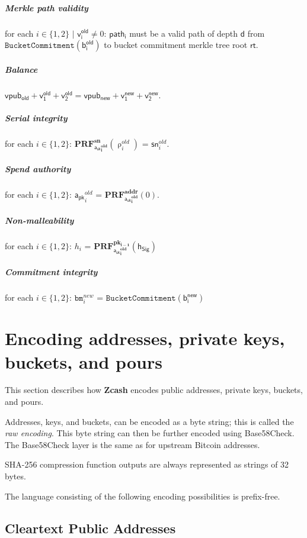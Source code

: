 \documentclass[8pt]{article}
\newcommand{\Zcash}{\textbf{Zcash} }
\newcommand{\SpendAuthorityPublic}{\mathsf{a_{pk}}}
\newcommand{\SpendAuthorityPrivate}{\mathsf{a_{sk}}}
\newcommand{\BucketAddressRand}{\mathsf{\uprho}}
\newcommand{\PRF}[2]{\mathbf{PRF_{#1}^{#2}}}
\newcommand{\PRFaddr}[1]{\PRF{#1}{addr}}
\newcommand{\PRFsn}[1]{\PRF{#1}{sn}}
\newcommand{\PRFpk}[2]{\PRF{#1}{pk_{#2}}}
\newcommand{\bm}{\mathbf{\mathtt{bm}}}
\newcommand{\MerkleDepth}{\mathsf{d}}
\newcommand{\sn}{\mathsf{sn}}
\newcommand{\rt}{\mathsf{rt}}
\newcommand{\hSig}{\mathsf{h_{Sig}}}
\newcommand{\vpubold}{\mathsf{vpub_{old}}}
\newcommand{\vpubnew}{\mathsf{vpub_{new}}}
\newcommand{\bOld}[1]{\mathsf{b_{#1}^{old}}}
\newcommand{\bNew}[1]{\mathsf{b_{#1}^{new}}}
\newcommand{\vOld}[1]{\mathsf{v_{#1}^{old}}}
\newcommand{\vNew}[1]{\mathsf{v_{#1}^{new}}}
\newcommand{\path}[1]{\mathsf{path_{#1}}}
\newcommand{\BucketCommitment}[1]{\mathtt{BucketCommitment(#1)}}
\begin{document}
\subparagraph{Merkle path validity}

for each $i \in \{1, 2\}$ $\mid$ $\vOld{i} \neq 0$: $\path{i}$ must be a valid path of depth $\MerkleDepth$ from \linebreak $\BucketCommitment{\bOld{i}}$ to bucket commitment merkle tree root $\rt$.

\subparagraph{Balance}

$\vpubold + \vOld{1} + \vOld{2} = \vpubnew + \vNew{1} + \vNew{2}$.

\subparagraph{Serial integrity}

for each $i \in \{1, 2\}$: $\PRFsn{\SpendAuthorityPrivate^{old}_{i}}(\BucketAddressRand^{old}_{i})$ = $\sn^{old}_{i}$.

\subparagraph{Spend authority}

for each $i \in \{1, 2\}$: $\SpendAuthorityPublic^{old}_{i}$ = $\PRFaddr{\SpendAuthorityPrivate^{old}_{i}}(0)$.

\subparagraph{Non-malleability}

for each $i \in \{1, 2\}$: $h_i$ = $\PRFpk{\SpendAuthorityPrivate^{old}_i}{i-1}(\hSig)$

\subparagraph{Commitment integrity}

for each $i \in \{1, 2\}$: $\bm^{new}_i$ = $\BucketCommitment{\bNew{i}}$

\section{Encoding addresses, private keys, buckets, and pours}

This section describes how \Zcash encodes public addresses, private keys,
buckets, and pours.

Addresses, keys, and buckets, can be encoded as a byte string; this is called
the \emph{raw encoding}. This byte string can then be further encoded using
Base58Check. The Base58Check layer is the same as for upstream Bitcoin
addresses.

SHA-256 compression function outputs are always represented as strings of 32
bytes.

The language consisting of the following encoding possibilities is prefix-free.

\subsection{Cleartext Public Addresses}
\end{document}
